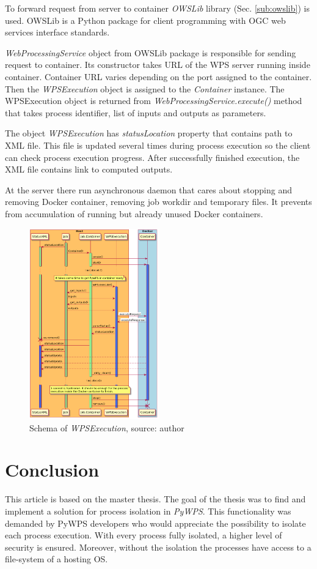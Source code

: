 \documentclass{gifce}
\begin{document}
To forward request from server to container \textit{OWSLib}
library (Sec. \ref{sub:owslib}) is used. OWSLib is a Python package for client programming with OGC web services 
interface standards.

\textit{WebProcessingService} object from OWSLib package is responsible for sending request to container. Its constructor takes URL of the
WPS server running inside container. Container URL varies depending on the port assigned to the container. Then the \textit{WPSExecution}
object is assigned to the \textit{Container} instance. The WPS\-Execution object is returned from \textit{WebProcessingService.execute()} 
method that takes process identifier, list of inputs and outputs as parameters.

The object \textit{WPSExecution} has \textit{statusLocation} property that contains path to XML file.
This file is updated several times during process execution so the client can check process execution progress.
After successfully finished execution, the XML file contains link to computed outputs.

At the server there run asynchronous daemon that cares about stopping and removing Docker container, removing
job workdir and temporary files. It prevents from accumulation of running but already unused Docker containers.


\begin{figure}[h!]
\centering
\includegraphics[width=0.5\textwidth]{img/Diag_WPSExecute.png}
\caption{Schema of \textit{WPSExecution}, source: author}
\label{fig:DiagWPSExecute}
\end{figure}


\section{Conclusion}

This article is based on the master thesis. The goal of the thesis 
was to find and implement a solution for
process isolation in \textit{PyWPS}. This functionality was demanded
by PyWPS developers who would appreciate the possibility to isolate
each process execution. With every process fully isolated, a higher
level of security is ensured. Moreover, without the isolation the
processes have access to a file-system of a hosting OS.


\printbibliography[heading=subbibliography]
\cleardoublepage
\end{document}
